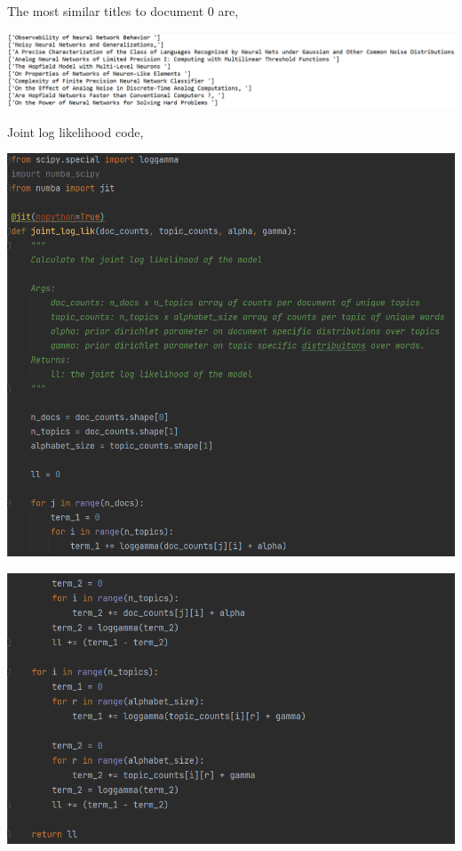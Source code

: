 \documentclass[10pt]{homeworg}
\begin{document}
The most similar titles to document 0 are,

\begin{flushleft}
\includegraphics[scale=0.6]{figures/most_similar_titles_to_0}
\end{flushleft}

\newpage

Joint log likelihood code,

\begin{center}
\includegraphics[scale=0.6]{figures/jll_code_1.png}
\end{center}

\begin{center}
\includegraphics[scale=0.65]{figures/jll_code_2.png}
\end{center}
\end{document}
